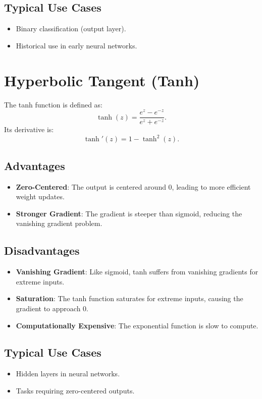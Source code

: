 \begin{notechapter}
\subsection{Typical Use Cases}
\begin{itemize}[leftmargin=*]
    \item Binary classification (output layer).
    \item Historical use in early neural networks.
\end{itemize}

\section{Hyperbolic Tangent (Tanh)}
The tanh function is defined as:
\[
\tanh(z) = \frac{e^z - e^{-z}}{e^z + e^{-z}}.
\]
Its derivative is:
\[
\tanh'(z) = 1 - \tanh^2(z).
\]

\subsection{Advantages}
\begin{itemize}[leftmargin=*]
    \item \textbf{Zero-Centered}: The output is centered around 0, leading to
    more efficient weight updates.
    \item \textbf{Stronger Gradient}: The gradient is steeper than sigmoid,
    reducing the vanishing gradient problem.
\end{itemize}

\subsection{Disadvantages}
\begin{itemize}[leftmargin=*]
    \item \textbf{Vanishing Gradient}: Like sigmoid, tanh suffers from vanishing
    gradients for extreme inputs.
    \item \textbf{Saturation}: The tanh function saturates for extreme inputs,
    causing the gradient to approach 0.
    \item \textbf{Computationally Expensive}: The exponential function is slow
    to compute.
\end{itemize}

\subsection{Typical Use Cases}
\begin{itemize}[leftmargin=*]
    \item Hidden layers in neural networks.
    \item Tasks requiring zero-centered outputs.
\end{itemize}


\end{notechapter}
